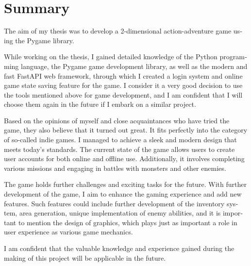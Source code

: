 \chapter{Summary}
\begin{otherlanguage}{english}
 The aim of my thesis was to develop a 2-dimensional action-adventure game using the Pygame library.

While working on the thesis, I gained detailed knowledge of the Python programming language, the Pygame game development library, as well as the modern and fast FastAPI web framework, through which I created a login system and online game state saving feature for the game. I consider it a very good decision to use the tools mentioned above for game development, and I am confident that I will choose them again in the future if I embark on a similar project.

Based on the opinions of myself and close acquaintances who have tried the game, they also believe that it turned out great. It fits perfectly into the category of so-called indie games. I managed to achieve a sleek and modern design that meets today's standards. The current state of the game allows users to create user accounts for both online and offline use. Additionally, it involves completing various missions and engaging in battles with monsters and other enemies.

The game holds further challenges and exciting tasks for the future. With further development of the game, I aim to enhance the gaming experience and add new features. Such features could include further development of the inventory system, area generation, unique implementation of enemy abilities, and it is important to mention the design of graphics, which plays just as important a role in user experience as various game mechanics.

I am confident that the valuable knowledge and experience gained during the making of this project will be applicable in the future.
\end{otherlanguage}